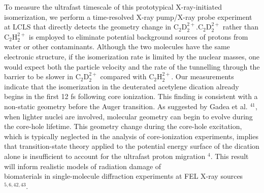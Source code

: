 \documentclass[10pt]{article}
\begin{document}
To measure the ultrafast timescale of this prototypical X-ray-initiated isomerization, we perform a time-resolved X-ray pump/X-ray probe experiment at LCLS that directly detects the geometry change in $\mathrm{C}_{2} \mathrm{D}_{2}^{2+} . \mathrm{C}_{2} \mathrm{D}_{2}^{2+}$ rather than $\mathrm{C}_{2} \mathrm{H}_{2}^{2+}$ is employed to eliminate potential background sources of protons from water or other contaminants. Although the two molecules have the same electronic structure, if the isomerization rate is limited by the nuclear masses, one would expect both the particle velocity and the rate of the tunnelling through the barrier to be slower in $\mathrm{C}_{2} \mathrm{D}_{2}^{2+}$ compared with $\mathrm{C}_{2} \mathrm{H}_{2}^{2+}$. Our measurements indicate that the isomerization in the deuterated acetylene dication already begins in the first 12 fs following core ionization. This finding is consistent with a non-static geometry before the Auger transition. As suggested by Gadea et al. ${ }^{41}$, when lighter nuclei are involved, molecular geometry can begin to evolve during the core-hole lifetime. This geometry change during the core-hole excitation, which is typically neglected in the analysis of core-ionization experiments, implies that transition-state theory applied to the potential energy surface of the dication alone is insufficient to account for the ultrafast proton migration ${ }^{4}$. This result will inform realistic models of radiation damage of\\
biomaterials in single-molecule diffraction experiments at FEL X-ray sources ${ }^{5,6,42,43}$.
\end{document}
